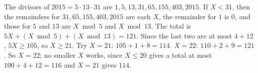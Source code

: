 The divisors of $2015=5\cdot13\cdot31$ are $1,5,13,31,65,155,403,2015$. If $X<31$, then the remainders for $31,65,155,403,2015$ are each $X$, the remainder for $1$ is $0$, and those for $5$ and $13$ are $X\bmod5$ and $X\bmod13$. The total is $5X+(X\bmod5)+(X\bmod13)=121$. Since the last two are at most $4+12$, $5X\ge105$, so $X\ge21$. Try $X=21$: $105+1+8=114$. $X=22$: $110+2+9=121$. So $X=\boxed{22}$; no smaller $X$ works, since $X\le20$ gives a total at most $100+4+12=116$ and $X=21$ gives $114$.
